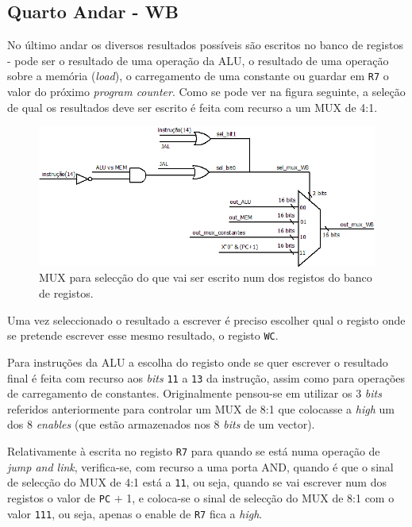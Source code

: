 \documentclass[11pt]{article}
\numberwithin{equation}{section}
\begin{document}
\subsection{Quarto Andar - WB}

No último andar os diversos resultados possíveis são escritos no banco de registos - pode ser o resultado de uma operação da ALU, o resultado de uma operação sobre a memória (\textit{load}), o carregamento de uma constante ou guardar em \texttt{R7} o valor do próximo \textit{program counter}. Como se pode ver na figura seguinte, a seleção de qual os resultados deve ser escrito é feita com recurso a um MUX de 4:1. 

\begin{figure}[h]
	\centering
	\includegraphics[keepaspectratio=true, scale=0.35]{imagens/WB1}
	\caption{MUX para selecção do que vai ser escrito num dos registos do banco de registos.}
	\vspace{-0.8em}
\end{figure}

Uma vez seleccionado o resultado a escrever é preciso escolher qual o registo onde se pretende escrever esse mesmo resultado, o registo \texttt{WC}. 

Para instruções da ALU a escolha do registo onde se quer escrever o resultado final é feita com recurso aos \textit{bits} \texttt{11} a \texttt{13} da instrução, assim como para operações de carregamento de constantes. Originalmente pensou-se em utilizar os 3 \textit{bits} referidos anteriormente para controlar um MUX de 8:1 que colocasse a \textit{high} um dos 8 \textit{enables} (que estão armazenados nos 8 \textit{bits} de um vector).

Relativamente à escrita no registo \texttt{R7} para quando se está numa operação de \textit{jump and link}, verifica-se, com recurso a uma porta AND, quando é que o sinal de selecção do MUX de 4:1 está a \texttt{11}, ou seja, quando se vai escrever num dos registos o valor de \texttt{PC} $+$ 1, e coloca-se o sinal de selecção do MUX de 8:1 com o valor \texttt{111}, ou seja, apenas o enable de \texttt{R7} fica a \textit{high}.
\end{document}
